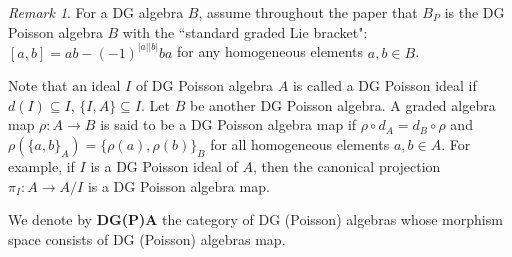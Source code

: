 \documentclass[a4paper,10pt]{amsart}
\theoremstyle{definition}
\theoremstyle{remark}
\newtheorem{remark}[theorem]{Remark}
\numberwithin{equation}{section}
\begin{document}
\begin{remark}
For a DG algebra $B$, assume throughout the paper that $B_P$ is the
DG Poisson algebra $B$ with the ``standard graded Lie bracket": $[a,
b]=ab-(-1)^{|a||b|}ba$ for any homogeneous elements $a, b\in B$.
\end{remark}

Note that an ideal $I$ of DG Poisson algebra $A$ is called a DG
Poisson ideal if $d(I)\subseteq I$, $\{I, A\}\subseteq I$. Let $B$
be another DG Poisson algebra. A graded algebra map
$\rho: A\rightarrow B$ is said to be a DG Poisson algebra map if
$\rho\circ d_A=d_B\circ \rho$ and $\rho(\{a, b\}_A)=\{\rho(a),
\rho(b)\}_B$ for all homogeneous elements $a, b\in A$. For example,
if $I$ is a DG Poisson ideal of $A$, then the canonical projection
$\pi_{I}: A\rightarrow A/I$ is a DG Poisson algebra map.

We denote by \textbf{DG(P)A} the category of DG (Poisson) algebras
whose morphism space consists of DG (Poisson) algebras map.
\end{document}
